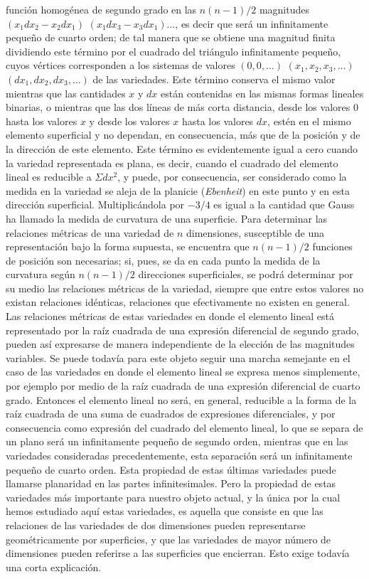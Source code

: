 \documentclass[a4paper, 12pt]{article}
\begin{document}
función homogénea de segundo grado en las $n(n-1)/2$  magnitudes $(x_1dx_2-x_2dx_1)$ $(x_1dx_3-x_3dx_1)\dots$, es decir que será un infinitamente pequeño de cuarto orden; de tal manera que se obtiene una magnitud finita dividiendo este término por el cuadrado del triángulo infinitamente pequeño, cuyos vértices corresponden a los sistemas de valores $(0,0, \dots)$ $(x_1,x_2, x_3, \dots )$ $(dx_1, dx_2,dx_3, \dots)$ de las variedades. Este término conserva el mismo valor mientras que las cantidades $x$ y $dx$ están contenidas en las mismas formas lineales binarias, o mientras que las dos líneas de más corta distancia, desde los valores $0$ hasta los valores $x$ y desde los valores $x$ hasta los valores $dx$, estén en el mismo elemento superficial y no dependan, en consecuencia, más que de la posición y de la dirección de este elemento. Este término es evidentemente igual a cero cuando la variedad representada es plana, es decir, cuando el cuadrado del elemento lineal es reducible a $\Sigma dx^2$, y puede, por consecuencia, ser considerado como la medida en la variedad se aleja de la planicie (\textit{Ebenheit}) en este punto y en esta dirección superficial. Multiplicándola por $- 3/4$ es igual a la cantidad que Gauss ha llamado la medida de curvatura de una superficie. Para determinar las relaciones métricas de una variedad de $n$ dimensiones, susceptible de una representación bajo la forma supuesta, se encuentra que $n(n-1)/2$ funciones de posición son necesarias; si, pues, se da en cada punto la medida de la curvatura según $n(n-1)/2$ direcciones  superficiales, se podrá determinar por su medio las relaciones métricas de la variedad, siempre que entre estos valores no existan relaciones idénticas, relaciones que efectivamente no existen en general. Las relaciones métricas de estas variedades en donde el elemento lineal está representado por la raíz cuadrada de una expresión diferencial de segundo grado, pueden así expresarse de manera independiente de la elección de las magnitudes variables. Se puede todavía para este objeto seguir una marcha semejante en el caso de las variedades en donde el elemento lineal se expresa menos simplemente, por ejemplo por medio de la raíz cuadrada de una expresión diferencial de cuarto grado. Entonces el elemento lineal no será, en general, reducible a la forma de la raíz cuadrada de una suma de cuadrados de expresiones diferenciales, y por consecuencia como expresión del cuadrado del elemento lineal, lo que se separa de un plano será un infinitamente pequeño de segundo orden, mientras que en las variedades consideradas precedentemente, esta separación será un infinitamente pequeño de cuarto orden. Esta propiedad de estas últimas variedades puede llamarse planaridad en las partes infinitesimales. Pero la propiedad de estas variedades más importante para nuestro objeto actual, y la única por la cual hemos estudiado aquí estas variedades, es aquella que consiste en que las relaciones de las variedades de dos dimensiones pueden representarse geométricamente por superficies, y que las variedades de mayor número de dimensiones pueden referirse a las superficies que encierran. Esto exige todavía una corta explicación.
\end{document}
